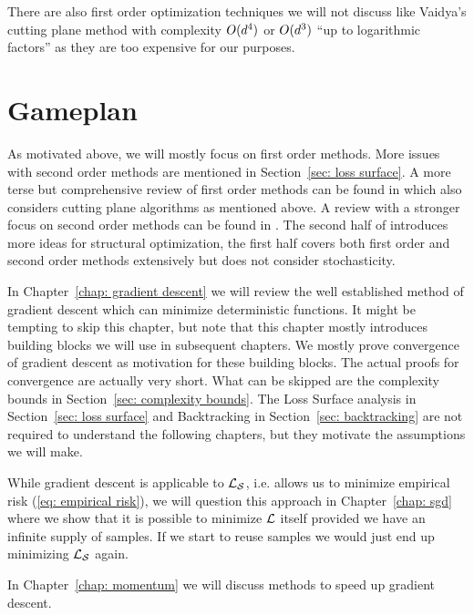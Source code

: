There are also first order optimization techniques we will not discuss like
Vaidya's cutting plane method
\parencite[e.g.][]{bubeckConvexOptimizationAlgorithms2015} with complexity
\(O(d^4)\) or \(O(d^3)\) ``up to logarithmic factors''
\parencite[Section 2.3]{bubeckConvexOptimizationAlgorithms2015} as they are
too expensive for our purposes.

\section{Gameplan}

As motivated above, we will mostly focus on first order methods. More
issues with second order methods are mentioned in Section~\ref{sec: loss
surface}. A more terse but comprehensive review of first order methods can be found in
\textcite{bubeckConvexOptimizationAlgorithms2015} which also considers cutting
plane algorithms as mentioned above. A review with a stronger focus on second
order methods can be found in
\textcite{bottouOptimizationMethodsLargeScale2018}. The second half of
\textcite{nesterovLecturesConvexOptimization2018} introduces more ideas for
structural optimization, the first half covers both first order and second
order methods extensively but does not consider stochasticity.

In Chapter~\ref{chap: gradient descent} we will review the well
established method of gradient descent which can minimize deterministic
functions. It might be tempting to skip this chapter, but note that this chapter 
mostly introduces building blocks we will use in subsequent chapters. We mostly
prove convergence of gradient descent as motivation for these building blocks.
The actual proofs for convergence are actually very short. What can be skipped
are the complexity bounds in Section~\ref{sec: complexity bounds}. The
Loss Surface analysis in Section~\ref{sec: loss surface} and Backtracking
in Section~\ref{sec: backtracking} are not required to understand the following
chapters, but they motivate the assumptions we will make.

While gradient descent is applicable to \(\mathcal{L}_{\mathcal{S}}\), i.e. allows us
to minimize empirical risk (\ref{eq: empirical risk}), we will question this
approach in Chapter~\ref{chap: sgd} where we show that it is possible to
minimize \(\mathcal{L}\) itself provided we have an infinite supply of samples. If we
start to reuse samples we would just end up minimizing \(\mathcal{L}_{\mathcal{S}}\) again.

In Chapter~\ref{chap: momentum} we will discuss methods to speed up
gradient descent.



\endinput
